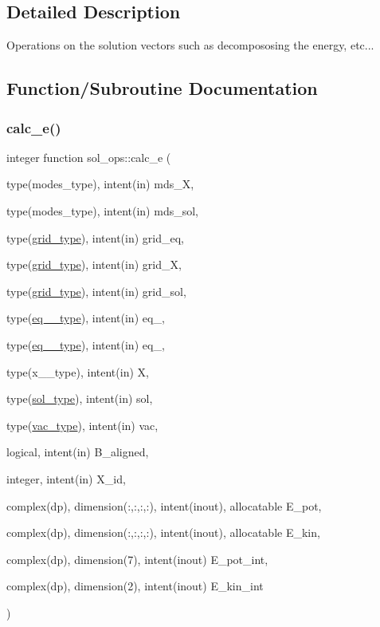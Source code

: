 \subsection{Detailed Description}
Operations on the solution vectors such as decompososing the energy, etc... 

\subsection{Function/\+Subroutine Documentation}
\mbox{\label{namespacesol__ops_ae094c2a5235324b4aadb53623978d191}} 
\subsubsection{\texorpdfstring{calc\+\_\+e()}{calc\_e()}}
{\footnotesize\ttfamily integer function sol\+\_\+ops\+::calc\+\_\+e (\begin{DoxyParamCaption}\item[{type(modes\+\_\+type), intent(in)}]{mds\+\_\+X,  }\item[{type(modes\+\_\+type), intent(in)}]{mds\+\_\+sol,  }\item[{type(\hyperlink{structgrid__vars_1_1grid__type}{grid\+\_\+type}), intent(in)}]{grid\+\_\+eq,  }\item[{type(\hyperlink{structgrid__vars_1_1grid__type}{grid\+\_\+type}), intent(in)}]{grid\+\_\+X,  }\item[{type(\hyperlink{structgrid__vars_1_1grid__type}{grid\+\_\+type}), intent(in)}]{grid\+\_\+sol,  }\item[{type(\hyperlink{structeq__vars_1_1eq__1__type}{eq\+\_\+1\+\_\+type}), intent(in)}]{eq\+\_,  }\item[{type(\hyperlink{structeq__vars_1_1eq__2__type}{eq\+\_\+2\+\_\+type}), intent(in)}]{eq\+\_,  }\item[{type(x\+\_\+1\+\_\+type), intent(in)}]{X,  }\item[{type(\hyperlink{structsol__vars_1_1sol__type}{sol\+\_\+type}), intent(in)}]{sol,  }\item[{type(\hyperlink{structvac__vars_1_1vac__type}{vac\+\_\+type}), intent(in)}]{vac,  }\item[{logical, intent(in)}]{B\+\_\+aligned,  }\item[{integer, intent(in)}]{X\+\_\+id,  }\item[{complex(dp), dimension(\+:,\+:,\+:,\+:), intent(inout), allocatable}]{E\+\_\+pot,  }\item[{complex(dp), dimension(\+:,\+:,\+:,\+:), intent(inout), allocatable}]{E\+\_\+kin,  }\item[{complex(dp), dimension(7), intent(inout)}]{E\+\_\+pot\+\_\+int,  }\item[{complex(dp), dimension(2), intent(inout)}]{E\+\_\+kin\+\_\+int }\end{DoxyParamCaption})}



